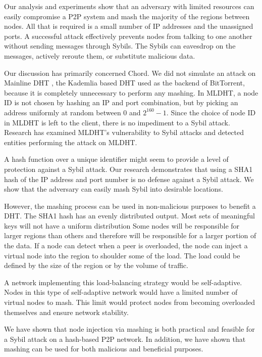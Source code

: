 \documentclass[11pt,conference]{IEEEtran}
\begin{document}
Our analysis and experiments show that an adversary with limited resources can easily compromise a P2P system and mash the majority of the regions between nodes.
All that is required is a small number of IP addresses and the unassigned ports.
A successful attack effectively prevents nodes from talking to one another without sending messages through Sybils.
The Sybils can eavesdrop on the messages, actively reroute them, or substitute malicious data.

Our discussion has primarily concerned Chord.
We did not simulate an attack on Mainline DHT  \cite{mainline}, the Kademlia \cite{kademlia} based DHT used as the backend of BitTorrent, because it is completely unnecessary to perform any mashing.
In MLDHT, a node ID is not chosen by hashing an IP and port combination, but by picking an address uniformly at random between 0 and $2^{160}-1$.
Since the choice of node ID in MLDHT is left to the client, there is no impediment to a Sybil attack. 
Research has examined MLDHT's vulnerability to Sybil attacks \cite{sybilbit} and detected entities performing the attack on MLDHT.

A hash function over a unique identifier might seem to provide a level of protection against a Sybil attack.
Our research demonstrates that using a SHA1 hash of the IP address and port number is no defense against a Sybil attack. 
We show that the adversary can easily mash Sybil into desirable locations.


However, the mashing process can be used in non-malicious purposes to benefit a DHT.
The SHA1 hash has an evenly distributed output. 
Most sets of meaningful keys will not have a uniform distribution \cite{shannon2001mathematical}
Some nodes will be responsible for larger regions than others and therefore will be responsible for a larger portion of the data.
If a node can detect when a peer is overloaded, the node can inject a virtual node into the region to shoulder some of the load.
The load could be defined by the size of the region or by the volume of traffic.

A network implementing this load-balancing strategy would be self-adaptive.
Nodes in this type of self-adaptive network would have a limited number of virtual nodes to mash.
This limit would protect nodes from becoming overloaded themselves and ensure network stability.

We have shown that node injection via mashing is both practical and feasible for a Sybil attack on a hash-based P2P network.
In addition, we have shown that mashing can be used for both malicious and beneficial purposes.




\end{document}
